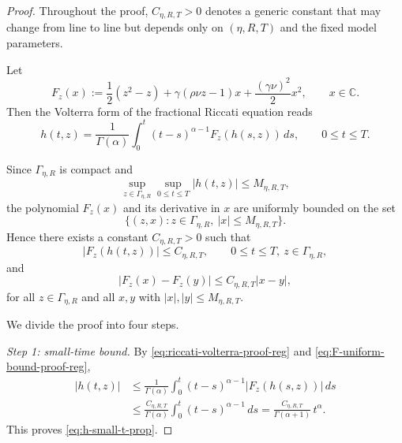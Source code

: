 \documentclass[10pt,a4paper]{amsart}
\newcommand{\C}{\mathbb{C}}
\begin{document}
\begin{proof}
Throughout the proof, $C_{\eta,R,T}>0$ denotes a generic constant that may
change from line to line but depends only on $(\eta,R,T)$ and the fixed model
parameters.

Let
\[
  F_z(x):=\frac12(z^2-z)+\gamma(\rho\nu z-1)x+\frac{(\gamma\nu)^2}{2}x^2,
  \qquad x\in\C.
\]
Then the Volterra form of the fractional Riccati equation reads
\begin{equation}\label{eq:riccati-volterra-proof-reg}
  h(t,z)
  =
  \frac{1}{\Gamma(\alpha)}
  \int_0^t (t-s)^{\alpha-1}F_z(h(s,z))\,ds,
  \qquad 0\le t\le T.
\end{equation}

Since $\Gamma_{\eta,R}$ is compact and
\[
  \sup_{z\in\Gamma_{\eta,R}}\sup_{0\le t\le T}|h(t,z)|
  \le M_{\eta,R,T},
\]
the polynomial $F_z(x)$ and its derivative in $x$ are uniformly bounded on the
set
\[
  \{(z,x): z\in\Gamma_{\eta,R},\ |x|\le M_{\eta,R,T}\}.
\]
Hence there exists a constant $C_{\eta,R,T}>0$ such that
\begin{equation}\label{eq:F-uniform-bound-proof-reg}
  |F_z(h(t,z))|\le C_{\eta,R,T},
  \qquad
  0\le t\le T,\ z\in\Gamma_{\eta,R},
\end{equation}
and
\begin{equation}\label{eq:F-lipschitz-proof-reg}
  |F_z(x)-F_z(y)|\le C_{\eta,R,T}|x-y|,
\end{equation}
for all $z\in\Gamma_{\eta,R}$ and all $x,y$ with $|x|,|y|\le M_{\eta,R,T}$.

We divide the proof into four steps.

\medskip
\noindent
\textit{Step 1: small-time bound.}
By \eqref{eq:riccati-volterra-proof-reg} and \eqref{eq:F-uniform-bound-proof-reg},
\begin{align*}
  |h(t,z)|
  &\le
  \frac{1}{\Gamma(\alpha)}
  \int_0^t (t-s)^{\alpha-1}|F_z(h(s,z))|\,ds\\
  &\le
  \frac{C_{\eta,R,T}}{\Gamma(\alpha)}
  \int_0^t (t-s)^{\alpha-1}\,ds
  =
  \frac{C_{\eta,R,T}}{\Gamma(\alpha+1)}\,t^\alpha.
\end{align*}
This proves \eqref{eq:h-small-t-prop}.


\end{proof}
\end{document}
